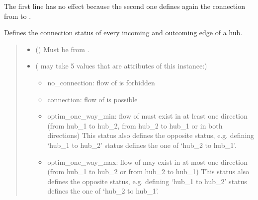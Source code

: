 \documentclass[letterpaper,10pt,english]{sphinxmanual}
\begin{document}
\begin{fulllineitems}
\begin{fulllineitems}
\sphinxAtStartPar
The first line has no effect because the second one defines again the connection from  to .

\end{fulllineitems}


\begin{fulllineitems}
\label{\detokenize{generated/tamos.network.NonThermalNetwork:tamos.network.NonThermalNetwork.set_node_status}}
\pysigstartsignatures
{}
\pysigstopsignatures
\sphinxAtStartPar
Defines the connection status of every incoming and outcoming edge of a hub.
\begin{quote}\begin{description}
\begin{itemize}
\item {} 
\sphinxAtStartPar
{} ({\hyperref[\detokenize{generated/tamos.Hub:tamos.Hub}]{}}) \textendash{} Must be from .

\item {} 
\sphinxAtStartPar
{} ( may take 5 values that are attributes of this instance:) \textendash{} \begin{itemize}
\item {} 
\sphinxAtStartPar
no\_connection: flow of  is forbidden

\item {} 
\sphinxAtStartPar
connection: flow of  is possible

\item {} 
\sphinxAtStartPar
optim\_one\_way\_min: flow of  must exist in at least one direction
(from hub\_1 to hub\_2, from hub\_2 to hub\_1 or in both directions)
This status also defines the opposite status, e.g. defining ‘hub\_1 to hub\_2’ status defines the one of ‘hub\_2 to hub\_1’.

\item {} 
\sphinxAtStartPar
optim\_one\_way\_max: flow of  may exist in at most one direction
(from hub\_1 to hub\_2 or from hub\_2 to hub\_1)
This status also defines the opposite status, e.g. defining ‘hub\_1 to hub\_2’ status defines the one of ‘hub\_2 to hub\_1’.


\end{itemize}
\end{itemize}
\end{description}
\end{quote}
\end{fulllineitems}
\end{fulllineitems}
\end{document}
